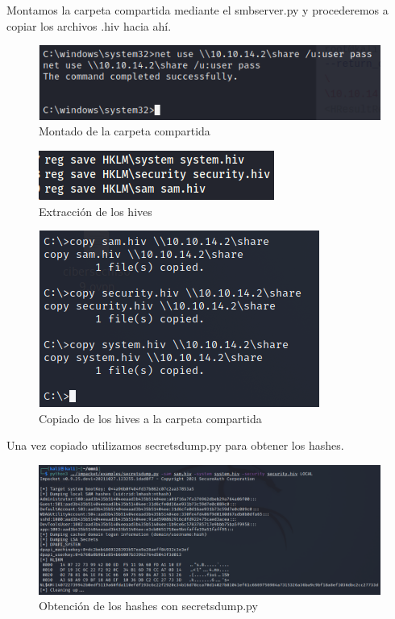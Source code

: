 \documentclass{article}
\begin{document}
Montamos la carpeta compartida mediante el smbserver.py y procederemos a copiar los archivos .hiv hacia ahí.
\begin{figure}[H]
	\center
	\includegraphics[width=\textwidth]{images/omni/12.png}
	\caption{Montado de la carpeta compartida}
\end{figure}
\begin{figure}[H]
	\center
	\includegraphics[width=\textwidth]{images/omni/13.png}
	\caption{Extracción de los hives}
\end{figure}
\begin{figure}[H]
	\center
	\includegraphics[width=\textwidth]{images/omni/14.png}
	\caption{Copiado de los hives a la carpeta compartida}
\end{figure}

Una vez copiado utilizamos secretsdump.py para obtener los hashes.
\begin{figure}[H]
	\center
	\includegraphics[width=\textwidth]{images/omni/15.png}
	\caption{Obtención de los hashes con secretsdump.py}
\end{figure}
\end{document}
